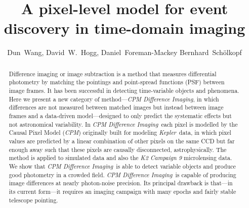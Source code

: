 \documentclass[12pt, preprint]{aastex}
\newcommand{\project}[1]{\textsl{#1}}
\newcommand{\cpm}{\project{CPM}}
\newcommand{\cpmdiff}{\project{CPM Difference Imaging}}
\newcommand{\kepler}{\project{Kepler}}
\begin{document}
\title{A pixel-level model for event discovery in time-domain imaging}
\author{%
  Dun~Wang\altaffilmark{\ref{CCPP},\ref{email}},
  David~W.~Hogg\altaffilmark{\ref{CCPP},\ref{CDS},\ref{MPIA},\ref{FI}},
  Daniel~Foreman-Mackey\altaffilmark{\ref{UW},\ref{SF}}
  Bernhard~Sch\"olkopf\altaffilmark{\ref{MPIIS}}
  }
\setcounter{address}{1}



\begin{abstract}
Difference imaging or image subtraction is a method that measures differential photometry by matching the pointings and point-spread functions (PSF) between image frames. 
It has been successful in detecting time-variable objects and phenomena.
Here we present a new category of method---\cpmdiff, in which differences are not measured between matched images but instead between image frames and a data-driven model---designed to only predict the systematic effects but not astronomical variability. 
In \cpmdiff\ each pixel is modelled by the Causal Pixel Model (\cpm) originally built for modeling \kepler\ data, in which pixel values are predicted by a linear combination of other pixels on the same CCD but far enough away such that these pixels are causally disconnected, astrophysically. 
The method is applied to  simulated data and also the \project{K2 Campaign 9} microlensing data. We show that \cpmdiff\ is able to detect variable objects and produce good photometry in a crowded field.
\cpmdiff\ is capable of producing image differences at nearly photon-noise precision. 
Its principal drawback is that---in its current form---it requires an imaging campaign with many epochs and fairly stable telescope pointing.

\end{abstract}
\end{document}
